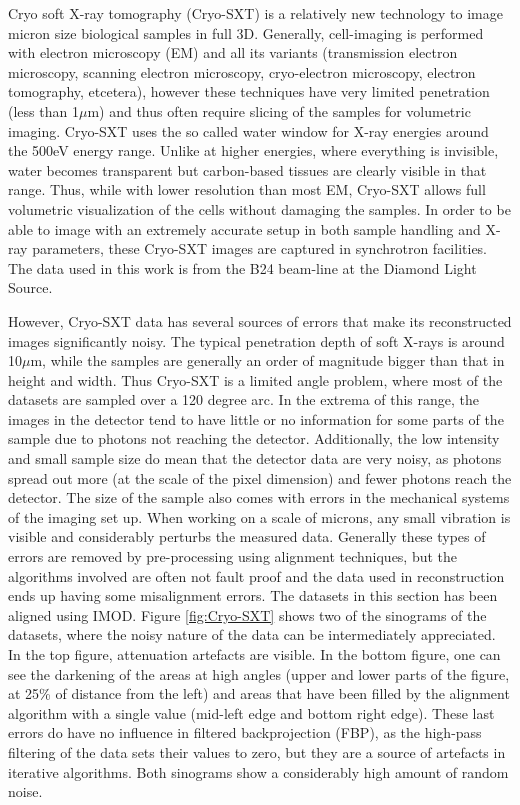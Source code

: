 Cryo soft X-ray tomography (Cryo-SXT) is a relatively new\cite{carzaniga2014cryo} technology to image micron size biological samples in full 3D. Generally, cell-imaging is performed with electron microscopy (EM) and all its variants (transmission electron microscopy, scanning electron microscopy, cryo-electron microscopy, electron tomography, etcetera), however these techniques have very limited penetration (less than 1$\mu$m) and thus often require slicing of the samples for volumetric imaging. Cryo-SXT uses the so called water window for X-ray energies around the 500eV energy range. Unlike at higher energies, where everything is invisible, water becomes transparent but carbon-based tissues are clearly visible in that range. Thus, while with lower resolution than most EM, Cryo-SXT allows full volumetric visualization of the cells without damaging the samples. In order to be able to image with an extremely accurate setup in both sample handling and X-ray parameters, these Cryo-SXT images are captured in synchrotron facilities. The data used in this work is from the B24 beam-line at the Diamond Light Source.

However, Cryo-SXT data has several sources of errors that make its reconstructed images significantly noisy. The typical penetration depth of soft X-rays is around 10$\mu$m, while the samples are generally an order of magnitude bigger than that in height and width. Thus Cryo-SXT is a limited angle problem, where most of the datasets are sampled over a 120 degree arc. In the extrema of this range, the images in the detector tend to have little or no information for some parts of the sample due to photons not reaching the detector. Additionally, the low intensity and small sample size do mean that the detector data are very noisy, as photons spread out more (at the scale of the pixel dimension) and fewer photons reach the detector. The size of the sample also comes with errors in the mechanical systems of the imaging set up. When working on a scale of microns, any small vibration is visible and considerably perturbs the measured data. Generally these types of errors are removed by pre-processing using alignment techniques, but the algorithms involved are often not fault proof and the data used in reconstruction ends up having some misalignment errors. The datasets in this section has been aligned using IMOD\cite{mastronarde1997dual}. Figure \ref{fig:Cryo-SXT} shows two of the sinograms of the datasets, where the noisy nature of the data can be intermediately appreciated. In the top figure, attenuation artefacts are visible. In the bottom figure, one can see the darkening of the areas at high angles (upper and lower parts of the figure, at 25\% of distance from the left) and areas that have been filled by the alignment algorithm with a single value (mid-left edge and bottom right edge). These last errors do have no influence in filtered backprojection (FBP), as the high-pass filtering of the data sets their values to zero, but they are a source of artefacts in iterative algorithms. Both sinograms show a considerably high amount of random noise.

